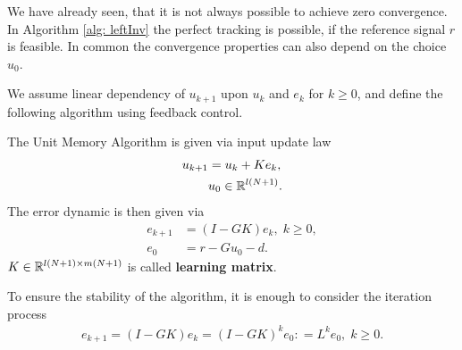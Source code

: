 We have already seen, that it is not always possible to achieve zero convergence. In Algorithm \ref{alg: leftInv} the perfect tracking is possible, if the reference signal $r$ is feasible. In common the convergence properties can also depend on the choice $u_0$.



We assume linear dependency of $u_{k+1}$ upon $u_k$ and $e_k$ for $k \geq 0$, and define the following algorithm using feedback control. 
\begin{alg}
	\label{alg: unitMemory}
	The Unit Memory Algorithm is given via input update law 
	\begin{align}
	\label{eq:clPlant}
	\begin{split}
	u_{k+1} &= u_k + K e_k, \\
	& u_0 \in {\mathbb{R}}^{l (N+1)}.
	\end{split}
	\end{align}	 
	The error dynamic is then given via
	\begin{align}
	e _{k+1} &= (I - G K) e_{k}, \; k \geq 0,\\
	e_0 &= r -  Gu_0 -d.
	\end{align}
	$K \in {\mathbb{R}}^{l(N+1) \times m(N+1)}$ is called \textbf{learning matrix}. 
\end{alg}

To ensure the stability of the algorithm, it is enough to consider the iteration process 
\begin{align}
\label{eq:e_k}
e_{k+1} = (I - G K) e_k = (I - G K)^k e_0  : =  L^k e_{0}, \; k \geq 0.
\end{align}

